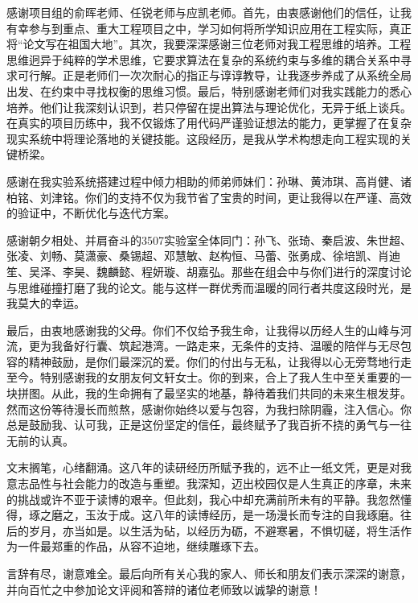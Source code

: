 \begin{acknowledgements}
  感谢项目组的俞晖老师、任锐老师与应凯老师。首先，由衷感谢他们的信任，让我有幸参与到重点、重大工程项目之中，学习如何将所学知识应用在工程实际，真正将“论文写在祖国大地”。其次，我要深深感谢三位老师对我工程思维的培养。工程思维迥异于纯粹的学术思维，它要求算法在复杂的系统约束与多维的耦合关系中寻求可行解。正是老师们一次次耐心的指正与谆谆教导，让我逐步养成了从系统全局出发、在约束中寻找权衡的思维习惯。最后，特别感谢老师们对我实践能力的悉心培养。他们让我深刻认识到，若只停留在提出算法与理论优化，无异于纸上谈兵。在真实的项目历练中，我不仅锻炼了用代码严谨验证想法的能力，更掌握了在复杂现实系统中将理论落地的关键技能。这段经历，是我从学术构想走向工程实现的关键桥梁。
  
  感谢在我实验系统搭建过程中倾力相助的师弟师妹们：孙琳、黄沛琪、高肖健、诸柏铭、刘津铭。你们的支持不仅为我节省了宝贵的时间，更让我得以在严谨、高效的验证中，不断优化与迭代方案。

  感谢朝夕相处、并肩奋斗的3507实验室全体同门：孙飞、张琦、秦启波、朱世超、张凌、刘畅、莫潇豪、桑锡超、邓慧敏、赵构恒、马蕾、张勇成、徐培凯、肖迪笙、吴泽、李昊、魏麟懿、程妍璇、胡嘉弘。那些在组会中与你们进行的深度讨论与思维碰撞打磨了我的论文。能与这样一群优秀而温暖的同行者共度这段时光，是我莫大的幸运。

  最后，由衷地感谢我的父母。你们不仅给予我生命，让我得以历经人生的山峰与河流，更为我备好行囊、筑起港湾。一路走来，无条件的支持、温暖的陪伴与无尽包容的精神鼓励，是你们最深沉的爱。你们的付出与无私，让我得以心无旁骛地行走至今。特别感谢我的女朋友何文轩女士。你的到来，合上了我人生中至关重要的一块拼图。从此，我的生命拥有了最坚实的地基，静待着我们共同的未来生根发芽。然而这份等待漫长而煎熬，感谢你始终以爱与包容，为我扫除阴霾，注入信心。你总是鼓励我、认可我，正是这份坚定的信任，最终赋予了我百折不挠的勇气与一往无前的认真。

  文末搁笔，心绪翻涌。这八年的读研经历所赋予我的，远不止一纸文凭，更是对我意志品性与社会能力的改造与重塑。我深知，迈出校园仅是人生真正的序章，未来的挑战或许不亚于读博的艰辛。但此刻，我心中却充满前所未有的平静。我忽然懂得，琢之磨之，玉汝于成。这八年的读博经历，是一场漫长而专注的自我琢磨。往后的岁月，亦当如是。以生活为砧，以经历为砺，不避寒暑，不惧切磋，将生活作为一件最郑重的作品，从容不迫地，继续雕琢下去。
  
  言辞有尽，谢意难全。最后向所有关心我的家人、师长和朋友们表示深深的谢意，并向百忙之中参加论文评阅和答辩的诸位老师致以诚挚的谢意！
\end{acknowledgements}
